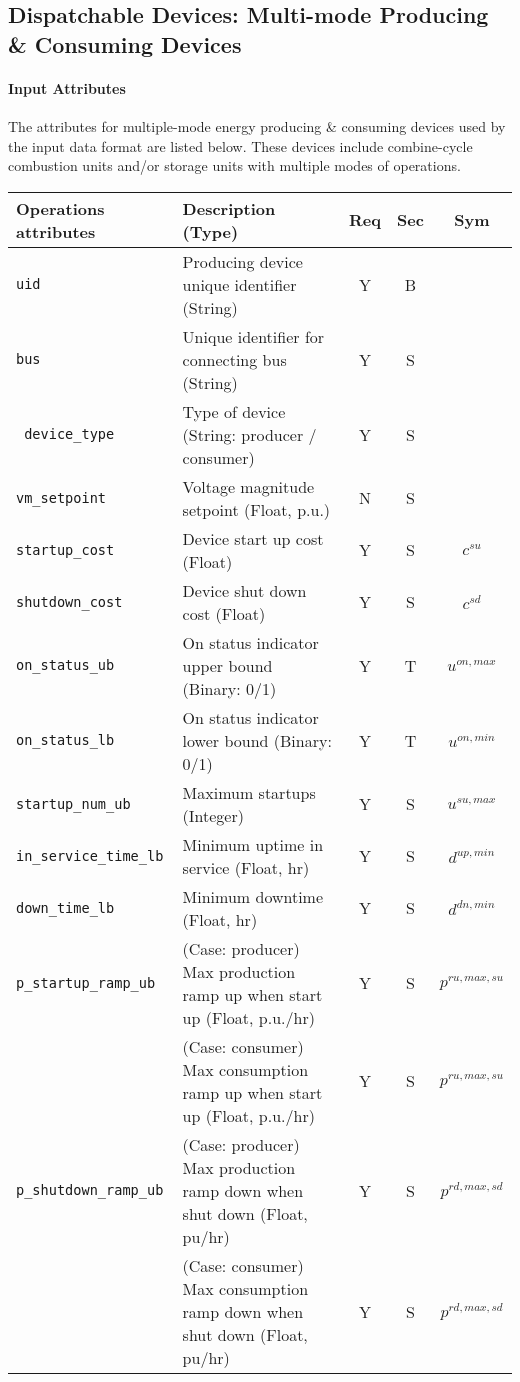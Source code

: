 \documentclass{article}
\begin{document}
\subsection{Dispatchable Devices: Multi-mode Producing \& Consuming Devices}
\label{nom:gen_multi}
\paragraph{Input Attributes} The attributes for 
multiple-mode energy producing \& consuming devices used by the input data format are listed below.
These devices include combine-cycle combustion units and/or storage units with multiple modes of operations. 

\begin{center}
\small
\begin{tabular}{ l | l | c | c | c |}
Operations attributes & Description (Type) & Req & Sec & Sym\\
\hline
  {\tt uid} & Producing device unique identifier (String) & Y & B &  \\
  {\tt bus} & Unique identifier for connecting bus (String)& Y & S & \\
  {\tt\color{red} device\_type} & Type of device (String: producer / consumer) & Y & S & \\
  {\tt vm\_setpoint} & Voltage magnitude setpoint (Float, p.u.) & N & S & \\
  {\tt startup\_cost} & Device start up cost (Float) & Y & S & $c^{su}$\\
  {\tt shutdown\_cost} & Device shut down cost (Float) & Y & S & $c^{sd}$\\  
  {\tt on\_status\_ub} & On status indicator upper bound (Binary: 0/1) & Y & T & $u^{on,max}$\\
  {\tt on\_status\_lb} & On status indicator lower bound (Binary: 0/1) & Y & T & $u^{on,min}$\\
  {\tt startup\_num\_ub} & Maximum startups (Integer) & Y & S & $u^{su,max}$\\  
  {\tt in\_service\_time\_lb} & Minimum uptime in service (Float, hr) & Y & S & $d^{up,min}$\\
  {\tt down\_time\_lb} & Minimum downtime (Float, hr) & Y & S & $d^{dn,min}$\\
  {\tt p\_startup\_ramp\_ub} & {\color{red}(Case: producer) Max production ramp up when start up (Float, p.u./hr)} & Y & S & $p^{ru,max,su}$\\
                 & {\color{red}(Case: consumer) Max consumption ramp up when start up (Float, p.u./hr)} & Y & S & $p^{ru,max,su}$\\
  {\tt p\_shutdown\_ramp\_ub}& {\color{red}(Case: producer) Max production ramp down when shut down (Float, pu/hr)} & Y & S & $p^{rd,max,sd}$\\
                 & {\color{red}(Case: consumer) Max consumption ramp down when shut down (Float, pu/hr)} & Y & S & $p^{rd,max,sd}$\\
  


\end{tabular}
\end{center}
\end{document}
